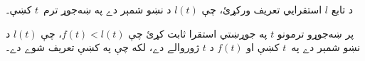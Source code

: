 \documentclass[../../../include/open-logic-section]{subfiles}
\begin{document}
\begin{prob}
د تابع $l$ استقرايي تعريف ورکړئ،
چې $l(t)$ د نښو شمېر دے په
ښه‌جوړ ترم~$t$ کښې۔
\end{prob}

\begin{prob}
پر ښه‌جوړو ترمونو $t$ په جوړښتي
استقرا ثابت کړئ چې $f(t) < l(t)$،
چې $l(t)$ د نښو شمېر دے په~$t$
کښې او $f(t)$ د $t$ ژوروالے دے،
لکه چې په 
کښې تعريف شوے دے۔
\end{prob}
\end{document}
